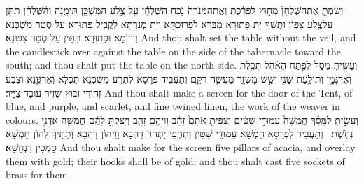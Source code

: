{וְשַׂמְתָּ֤ אֶת\maqqaf הַשֻּׁלְחָן֙ מִח֣וּץ לַפָּרֹ֔כֶת וְאֶת\maqqaf הַמְּנֹרָה֙ נֹ֣כַח הַשֻּׁלְחָ֔ן עַ֛ל צֶ֥לַע הַמִּשְׁכָּ֖ן תֵּימָ֑נָה וְהַ֨שֻּׁלְחָ֔ן תִּתֵּ֖ן עַל\maqqaf צֶ֥לַע צָפֽוֹן׃}
{וּתְשַׁוֵּי יָת פָּתוּרָא מִבַּרָא לְפָרוּכְתָּא וְיָת מְנָרְתָא לָקֳבֵיל פָּתוּרָא עַל סְטַר מַשְׁכְּנָא דָּרוֹמָא וּפָתוּרָא תִּתֵּין עַל סְטַר צִפּוּנָא׃}
{And thou shalt set the table without the veil, and the candlestick over against the table on the side of the tabernacle toward the south; and thou shalt put the table on the north side.}{}
{וְעָשִׂ֤יתָ מָסָךְ֙ לְפֶ֣תַח הָאֹ֔הֶל תְּכֵ֧לֶת וְאַרְגָּמָ֛ן וְתוֹלַ֥עַת שָׁנִ֖י וְשֵׁ֣שׁ מׇשְׁזָ֑ר מַעֲשֵׂ֖ה רֹקֵֽם׃}
{וְתַעֲבֵיד פְּרָסָא לִתְרַע מַשְׁכְּנָא תַּכְלָא וְאַרְגְּוָנָא וּצְבַע זְהוֹרִי וּבוּץ שְׁזִיר עוֹבָד צַיָּיר׃}
{And thou shalt make a screen for the door of the Tent, of blue, and purple, and scarlet, and fine twined linen, the work of the weaver in colours.}{}
{וְעָשִׂ֣יתָ לַמָּסָ֗ךְ חֲמִשָּׁה֙ עַמּוּדֵ֣י שִׁטִּ֔ים וְצִפִּיתָ֤ אֹתָם֙ זָהָ֔ב וָוֵיהֶ֖ם זָהָ֑ב וְיָצַקְתָּ֣ לָהֶ֔ם חֲמִשָּׁ֖ה אַדְנֵ֥י נְחֹֽשֶׁת׃ \setuma }
{וְתַעֲבֵיד לִפְרָסָא חַמְשָׁא עַמּוּדֵי שִׁטִּין וְתִחְפֵי יָתְהוֹן דַּהְבָּא וָוֵיהוֹן דַּהְבָּא וְתַתֵּיךְ לְהוֹן חַמְשָׁא סָמְכִין דִּנְחָשָׁא׃}
{And thou shalt make for the screen five pillars of acacia, and overlay them with gold; their hooks shall be of gold; and thou shalt cast five sockets of brass for them.}{}

